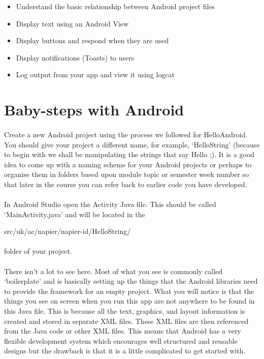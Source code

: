 \documentclass[12pt, a4paper, twoside]{book}
\begin{document}
\begin{itemize}
\item Understand the basic relationship between Android project files
\item Display text using an Android View
\item Display buttons and respond when they are used
\item Display notifications (Toasts) to users
\item Log output from your app and view it using logcat
\end{itemize}

\section{Baby-steps with Android}
\paragraph{} Create a new Android project using the process we followed for HelloAndroid. You should give your project a different name, for example, `HelloString' (because to begin with we shall be manipulating the strings that say Hello ;). It is a good idea to come up with a naming scheme for your Android projects or perhaps to organise them in folders based upon module topic or semester week number so that later in the course you can refer back to earlier code you have developed.

\paragraph{} In Android Studio open the Activity Java file. This should be called `MainActivity.java' and will be located in the 
\begin{framed}
src/uk/ac/napier/napier-id/HelloString/ 
\end{framed}
\paragraph{} folder of your project. 

\paragraph{} There isn’t a lot to see here. Most of what you see is commonly called `boilerplate' and is basically setting up the things that the Android libraries need to provide the framework for an empty project. What you will notice is that the things you see on screen when you run this app are not anywhere to be found in this Java file. This is because all the text, graphics, and layout information is created and stored in separate XML files. These XML files are then referenced from the Java code or other XML files. This means that Android has a very flexible development system which encourages well structured and reusable designs but the drawback is that it is a little complicated to get started with.
\end{document}
